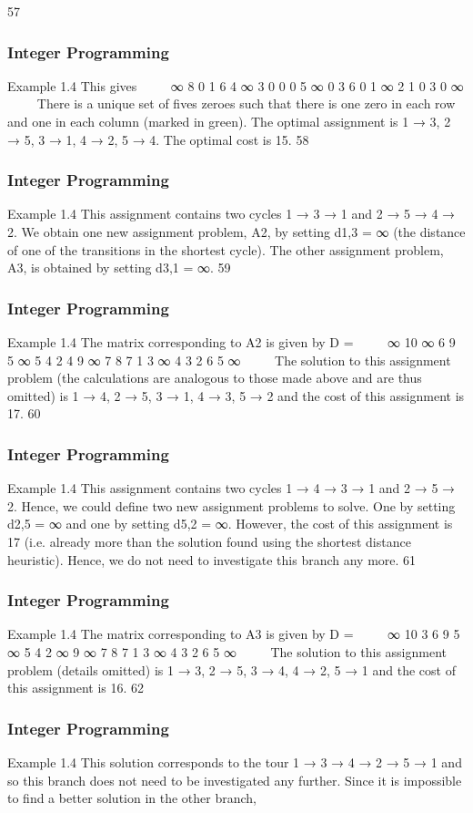\begin{frame}
57 \end{frame}  \begin{frame} \frametitle{Integer Programming}     
Example 1.4
This gives


∞ 8 0 1 6
4 ∞ 3 0 0
0 5 ∞ 0 3
6 0 1 ∞ 2
1 0 3 0 ∞


There is a unique set of fives zeroes such that there is one zero in
each row and one in each column (marked in green).
The optimal assignment is 1 → 3, 2 → 5, 3 → 1, 4 → 2, 5 → 4.
The optimal cost is 15.
58 \end{frame}  \begin{frame} \frametitle{Integer Programming}     
Example 1.4
This assignment contains two cycles 1 → 3 → 1 and
2 → 5 → 4 → 2.
We obtain one new assignment problem, A2, by setting d1,3 = ∞
(the distance of one of the transitions in the shortest cycle).
The other assignment problem, A3, is obtained by setting
d3,1 = ∞.
59 \end{frame}  \begin{frame} \frametitle{Integer Programming}     
Example 1.4
The matrix corresponding to A2 is given by
D =


∞ 10 ∞ 6 9
5 ∞ 5 4 2
4 9 ∞ 7 8
7 1 3 ∞ 4
3 2 6 5 ∞


The solution to this assignment problem (the calculations are
analogous to those made above and are thus omitted) is 1 → 4,
2 → 5, 3 → 1, 4 → 3, 5 → 2 and the cost of this assignment is 17.
60 \end{frame}  \begin{frame} \frametitle{Integer Programming}     
Example 1.4
This assignment contains two cycles 1 → 4 → 3 → 1 and
2 → 5 → 2.
Hence, we could define two new assignment problems to solve.
One by setting d2,5 = ∞ and one by setting d5,2 = ∞.
However, the cost of this assignment is 17 (i.e. already more than
the solution found using the shortest distance heuristic). Hence,
we do not need to investigate this branch any more.
61 \end{frame}  \begin{frame} \frametitle{Integer Programming}     
Example 1.4
The matrix corresponding to A3 is given by
D =


∞ 10 3 6 9
5 ∞ 5 4 2
∞ 9 ∞ 7 8
7 1 3 ∞ 4
3 2 6 5 ∞


The solution to this assignment problem (details omitted) is 1 → 3,
2 → 5, 3 → 4, 4 → 2, 5 → 1 and the cost of this assignment is 16.
62 \end{frame}  \begin{frame} \frametitle{Integer Programming}     
Example 1.4
This solution corresponds to the tour 1 → 3 → 4 → 2 → 5 → 1
and so this branch does not need to be investigated any further.
Since it is impossible to find a better solution in the other branch,

\end{frame}
